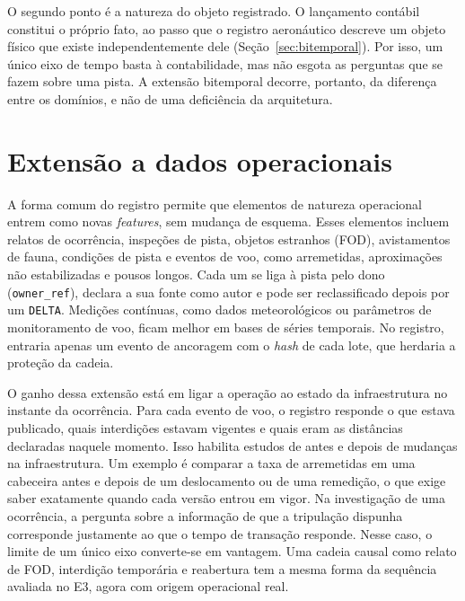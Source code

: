 O segundo ponto é a natureza do objeto registrado. O lançamento contábil constitui o próprio fato, ao passo que o registro aeronáutico descreve um objeto físico que existe independentemente dele (Seção~\ref{sec:bitemporal}). Por isso, um único eixo de tempo basta à contabilidade, mas não esgota as perguntas que se fazem sobre uma pista. A extensão bitemporal decorre, portanto, da diferença entre os domínios, e não de uma deficiência da arquitetura.

\section{Extensão a dados operacionais}\label{sec:disc-operacionais}

A forma comum do registro permite que elementos de natureza operacional entrem como novas \textit{features}, sem mudança de esquema. Esses elementos incluem relatos de ocorrência, inspeções de pista, objetos estranhos (FOD), avistamentos de fauna, condições de pista e eventos de voo, como arremetidas, aproximações não estabilizadas e pousos longos. Cada um se liga à pista pelo dono (\texttt{owner\_ref}), declara a sua fonte como autor e pode ser reclassificado depois por um \texttt{DELTA}. Medições contínuas, como dados meteorológicos ou parâmetros de monitoramento de voo, ficam melhor em bases de séries temporais. No registro, entraria apenas um evento de ancoragem com o \textit{hash} de cada lote, que herdaria a proteção da cadeia.

O ganho dessa extensão está em ligar a operação ao estado da infraestrutura no instante da ocorrência. Para cada evento de voo, o registro responde o que estava publicado, quais interdições estavam vigentes e quais eram as distâncias declaradas naquele momento. Isso habilita estudos de antes e depois de mudanças na infraestrutura. Um exemplo é comparar a taxa de arremetidas em uma cabeceira antes e depois de um deslocamento ou de uma remedição, o que exige saber exatamente quando cada versão entrou em vigor. Na investigação de uma ocorrência, a pergunta sobre a informação de que a tripulação dispunha corresponde justamente ao que o tempo de transação responde. Nesse caso, o limite de um único eixo converte-se em vantagem. Uma cadeia causal como relato de FOD, interdição temporária e reabertura tem a mesma forma da sequência avaliada no E3, agora com origem operacional real.

